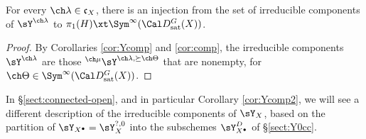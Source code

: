 \begin{cor}
\notready\label{cor:compY}
For every $\ch\lambda\in \mathfrak c_X$, there is an injection from the set of irreducible components of $\sY^{\ch\lambda}$ to $\pi_1(H) \xt \Sym^\infty(\Cal D^G_{\mathrm{sat}}(X))$.
\end{cor}

\begin{proof}
By Corollaries \ref{cor:Ycomp} and \ref{cor:comp}, the irreducible components $\sY^{\ch\lambda}$ are those $^{\ch\mu}\sY^{\ch\lambda,\succeq\ch\Theta}$ that are nonempty, for $\ch\Theta \in \Sym^\infty(\Cal D^G_{\mathrm{sat}}(X))$.
\end{proof}

In \S \ref{sect:connected-open}, and in particular Corollary \ref{cor:Ycomp2}, we will see a different description of the irreducible components of $\sY_X$, based on the partition of $\sY_{X^\bullet} = \sY_X^{?,0}$ into the subschemes $\sY^D_{X^\bullet}$ of \S \ref{sect:Y0cc}.
